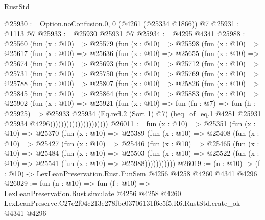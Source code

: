\begin{lexlean}{RustStd}
\begin{coremodule}
@25930 := Option.noConfusion.{0, 0} (@4261 (@25334 @1866)) @7
@25931 := @1113 @7
@25933 := @25930 @25931 @7
@25934 := @4295 @4341
@25988 := @25560
    (fun (x : @10) =>
    @25579
      (fun (x : @10) =>
      @25598
        (fun (x : @10) =>
        @25617
          (fun (x : @10) =>
          @25636
            (fun (x : @10) =>
            @25655
              (fun (x : @10) =>
              @25674
                (fun (x : @10) =>
                @25693
                  (fun (x : @10) =>
                  @25712
                    (fun (x : @10) =>
                    @25731
                      (fun (x : @10) =>
                      @25750
                        (fun (x : @10) =>
                        @25769
                          (fun (x : @10) =>
                          @25788
                            (fun (x : @10) =>
                            @25807
                              (fun (x : @10) =>
                              @25826
                                (fun (x : @10) =>
                                @25845
                                  (fun (x : @10) =>
                                  @25864
                                    (fun (x : @10) =>
                                    @25883
                                      (fun (x : @10) =>
                                      @25902
                                        (fun (x : @10) =>
                                        @25921
                                          (fun (x : @10) =>
                                          fun (fn : @7) =>
                                          fun (h : @25925) =>
                                          @25933
                                            @25934
                                            (Eq.refl.{2} (Sort 1) @7)
                                            (heq_of_eq.{1}
                                              @4281
                                              @25931
                                              @25934
                                              @4296)))))))))))))))))))))
@26011 := fun (x : @10) =>
  @25351
    (fun (x : @10) =>
    @25370
      (fun (x : @10) =>
      @25389
        (fun (x : @10) =>
        @25408
          (fun (x : @10) =>
          @25427
            (fun (x : @10) =>
            @25446
              (fun (x : @10) =>
              @25465
                (fun (x : @10) =>
                @25484
                  (fun (x : @10) =>
                  @25503
                    (fun (x : @10) =>
                    @25522 (fun (x : @10) => @25541 (fun (x : @10) => @25988)))))))))))
@26019 := (n : @10) -> (f : @10) -> LexLeanPreservation.Rust.FunSem @4256 @4258 @4260 @4341 @4296
@26029 := fun (n : @10) =>
  fun (f : @10) =>
  LexLeanPreservation.Rust.simulate
    @4256
    @4258
    @4260
    LexLeanPreserve.C27e2f04c213e278fbc03706131f6c5f5.R6.RustStd.crate_ok
    @4341
    @4296
\end{coremodule}
\end{lexlean}
